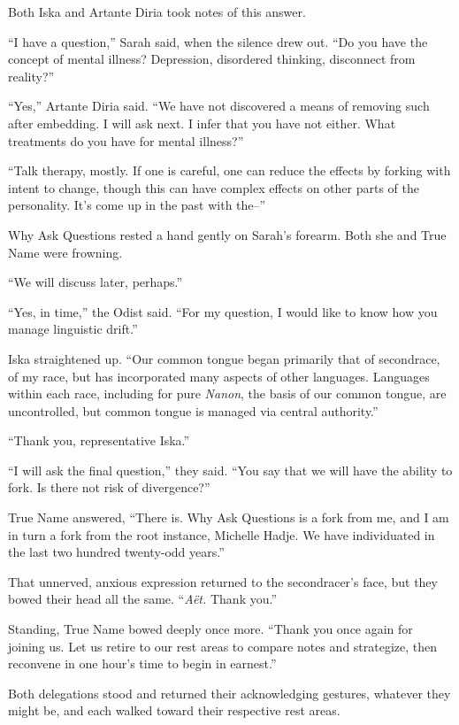 Both Iska and Artante Diria took notes of this answer.

``I have a question,'' Sarah said, when the silence drew out. ``Do you have the concept of mental illness? Depression, disordered thinking, disconnect from reality?''

``Yes,'' Artante Diria said. ``We have not discovered a means of removing such after embedding. I will ask next. I infer that you have not either. What treatments do you have for mental illness?''

``Talk therapy, mostly. If one is careful, one can reduce the effects by forking with intent to change, though this can have complex effects on other parts of the personality. It's come up in the past with the--''

Why Ask Questions rested a hand gently on Sarah's forearm. Both she and True Name were frowning.

``We will discuss later, perhaps.''

``Yes, in time,'' the Odist said. ``For my question, I would like to know how you manage linguistic drift.''

Iska straightened up. ``Our common tongue began primarily that of secondrace, of my race, but has incorporated many aspects of other languages. Languages within each race, including for pure \emph{Nanon}, the basis of our common tongue, are uncontrolled, but common tongue is managed via central authority.''

``Thank you, representative Iska.''

``I will ask the final question,'' they said. ``You say that we will have the ability to fork. Is there not risk of divergence?''

True Name answered, ``There is. Why Ask Questions is a fork from me, and I am in turn a fork from the root instance, Michelle Hadje. We have individuated in the last two hundred twenty-odd years.''

That unnerved, anxious expression returned to the secondracer's face, but they bowed their head all the same. ``\emph{Aët.} Thank you.''

Standing, True Name bowed deeply once more. ``Thank you once again for joining us. Let us retire to our rest areas to compare notes and strategize, then reconvene in one hour's time to begin in earnest.''

Both delegations stood and returned their acknowledging gestures, whatever they might be, and each walked toward their respective rest areas.

